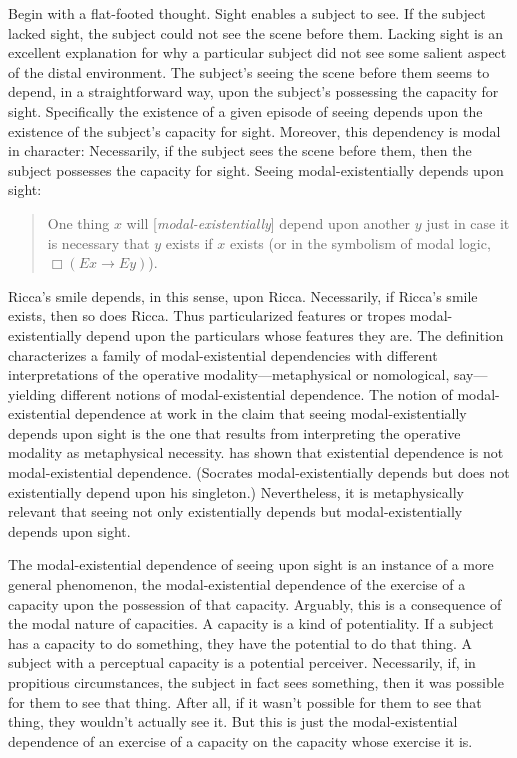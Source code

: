 \documentclass[12pt]{article}
\begin{document}
Begin with a flat-footed thought. Sight enables a subject to see. If the subject lacked sight, the subject could not see the scene before them. Lacking sight is an excellent explanation for why a particular subject did not see some salient aspect of the distal environment. The subject's seeing the scene before them seems to depend, in a straightforward way, upon the subject's possessing the capacity for sight. Specifically the existence of a given episode of seeing depends upon the existence of the subject's capacity for sight. Moreover, this dependency is modal in character: Necessarily, if the subject sees the scene before them, then the subject possesses the capacity for sight. Seeing modal-existentially depends upon sight:
\begin{quote}
    One thing \( x \) will [\emph{modal-existentially}] depend upon another \( y \) just in case it is necessary that \( y \) exists if \( x \) exists (or in the symbolism of modal logic, \( \Box(Ex \rightarrow Ey) \)). \citep[270]{Fine:1995ls} 
\end{quote}
Ricca's smile depends, in this sense, upon Ricca. Necessarily, if Ricca's smile exists, then so does Ricca. Thus particularized features or tropes modal-existen\-ti\-al\-ly depend upon the particulars whose features they are. The definition characterizes a family of modal-existential dependencies with different interpretations of the operative modality---metaphysical or nomological, say---yielding different notions of modal-existential dependence. The notion of modal-exis\-ten\-tial dependence at work in the claim that seeing modal-existentially depends upon sight is the one that results from interpreting the operative modality as metaphysical necessity. \citet{Fine:1995ls} has shown that existential dependence is not modal-existential dependence. (Socrates modal-existentially depends but does not existentially depend upon his singleton.) Nevertheless, it is metaphysically relevant that seeing not only existentially depends but modal-existentially depends upon sight.

The modal-existential dependence of seeing upon sight is an instance of a more general phenomenon, the modal-existential dependence of the exercise of a capacity upon the possession of that capacity. Arguably, this is a consequence of the modal nature of capacities. A capacity is a kind of potentiality. If a subject has a capacity to do something, they have the potential to do that thing. A subject with a perceptual capacity is a potential perceiver. Necessarily, if, in propitious circumstances, the subject in fact sees something, then it was possible for them to see that thing. After all, if it wasn't possible for them to see that thing, they wouldn't actually see it. But this is just the modal-existential dependence of an exercise of a capacity on the capacity whose exercise it is.
\end{document}
